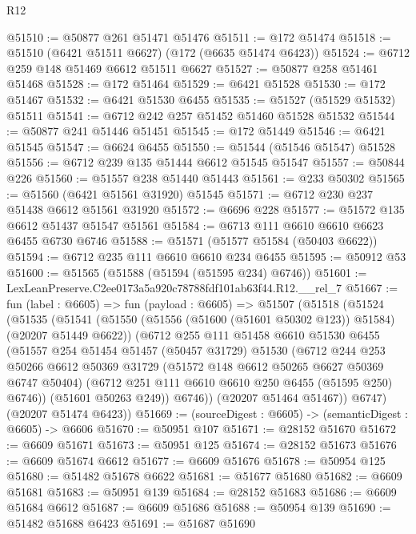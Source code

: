 \begin{lexlean}{R12}
\begin{coremodule}
@51510 := @50877 @261 @51471 @51476
@51511 := @172 @51474
@51518 := @51510 (@6421 @51511 @6627) (@172 (@6635 @51474 @6423))
@51524 := @6712 @259 @148 @51469 @6612 @51511 @6627
@51527 := @50877 @258 @51461 @51468
@51528 := @172 @51464
@51529 := @6421 @51528
@51530 := @172 @51467
@51532 := @6421 @51530 @6455
@51535 := @51527 (@51529 @51532) @51511
@51541 := @6712 @242 @257 @51452 @51460 @51528 @51532
@51544 := @50877 @241 @51446 @51451
@51545 := @172 @51449
@51546 := @6421 @51545
@51547 := @6624 @6455
@51550 := @51544 (@51546 @51547) @51528
@51556 := @6712 @239 @135 @51444 @6612 @51545 @51547
@51557 := @50844 @226
@51560 := @51557 @238 @51440 @51443
@51561 := @233 @50302
@51565 := @51560 (@6421 @51561 @31920) @51545
@51571 := @6712 @230 @237 @51438 @6612 @51561 @31920
@51572 := @6696 @228
@51577 := @51572 @135 @6612 @51437 @51547 @51561
@51584 := @6713 @111 @6610 @6610 @6623 @6455 @6730 @6746
@51588 := @51571 (@51577 @51584 (@50403 @6622))
@51594 := @6712 @235 @111 @6610 @6610 @234 @6455
@51595 := @50912 @53
@51600 := @51565 (@51588 (@51594 (@51595 @234) @6746))
@51601 := LexLeanPreserve.C2ee0173a5a920c78788fdf101ab63f44.R12.__rel_7
@51667 := fun (label : @6605) =>
  fun (payload : @6605) =>
  @51507
    (@51518
      (@51524
        (@51535
          (@51541
            (@51550 (@51556 (@51600 (@51601 @50302 @123)) @51584) (@20207 @51449 @6622))
            (@6712
              @255
              @111
              @51458
              @6610
              @51530
              @6455
              (@51557
                @254
                @51454
                @51457
                (@50457 @31729)
                @51530
                (@6712
                  @244
                  @253
                  @50266
                  @6612
                  @50369
                  @31729
                  (@51572 @148 @6612 @50265 @6627 @50369 @6747 @50404)
                  (@6712 @251 @111 @6610 @6610 @250 @6455 (@51595 @250) @6746))
                (@51601 @50263 @249))
              @6746))
          (@20207 @51464 @51467))
        @6747)
      (@20207 @51474 @6423))
@51669 := (sourceDigest : @6605) -> (semanticDigest : @6605) -> @6606
@51670 := @50951 @107
@51671 := @28152 @51670
@51672 := @6609 @51671
@51673 := @50951 @125
@51674 := @28152 @51673
@51676 := @6609 @51674 @6612
@51677 := @6609 @51676
@51678 := @50954 @125
@51680 := @51482 @51678 @6622
@51681 := @51677 @51680
@51682 := @6609 @51681
@51683 := @50951 @139
@51684 := @28152 @51683
@51686 := @6609 @51684 @6612
@51687 := @6609 @51686
@51688 := @50954 @139
@51690 := @51482 @51688 @6423
@51691 := @51687 @51690

\end{coremodule}
\end{lexlean}

